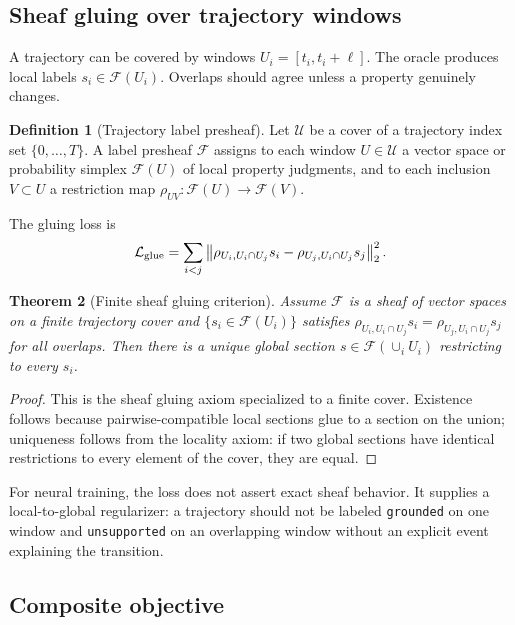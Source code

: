 \documentclass[11pt]{article}
\newtheorem{theorem}{Theorem}[section]
\theoremstyle{definition}
\newtheorem{definition}[theorem]{Definition}
\theoremstyle{remark}
\newcommand{\loss}{\mathcal{L}}
\newcommand{\norm}[1]{\left\lVert #1\right\rVert}
\numberwithin{equation}{section}
\begin{document}
\subsection{Sheaf gluing over trajectory windows}

A trajectory can be covered by windows \(U_i=[t_i,t_i+\ell]\).  The oracle produces local labels \(s_i\in\mathcal F(U_i)\).  Overlaps should agree unless a property genuinely changes.

\begin{definition}[Trajectory label presheaf]
Let \(\mathcal U\) be a cover of a trajectory index set \(\{0,\ldots,T\}\).  A label presheaf \(\mathcal F\) assigns to each window \(U\in\mathcal U\) a vector space or probability simplex \(\mathcal F(U)\) of local property judgments, and to each inclusion \(V\subset U\) a restriction map \(\rho_{UV}:\mathcal F(U)\to\mathcal F(V)\).
\end{definition}

The gluing loss is
\begin{equation}
    \loss_{\rm glue}=\sum_{i<j}\norm{\rho_{U_i,U_i\cap U_j}s_i-\rho_{U_j,U_i\cap U_j}s_j}_2^2.
\end{equation}

\begin{theorem}[Finite sheaf gluing criterion]
Assume \(\mathcal F\) is a sheaf of vector spaces on a finite trajectory cover and \(\{s_i\in\mathcal F(U_i)\}\) satisfies \(\rho_{U_i,U_i\cap U_j}s_i=\rho_{U_j,U_i\cap U_j}s_j\) for all overlaps.  Then there is a unique global section \(s\in\mathcal F(\cup_i U_i)\) restricting to every \(s_i\).
\end{theorem}
\begin{proof}
This is the sheaf gluing axiom specialized to a finite cover.  Existence follows because pairwise-compatible local sections glue to a section on the union; uniqueness follows from the locality axiom: if two global sections have identical restrictions to every element of the cover, they are equal.
\end{proof}

For neural training, the loss does not assert exact sheaf behavior.  It supplies a local-to-global regularizer: a trajectory should not be labeled \texttt{grounded} on one window and \texttt{unsupported} on an overlapping window without an explicit event explaining the transition.

\subsection{Composite objective}
\end{document}
